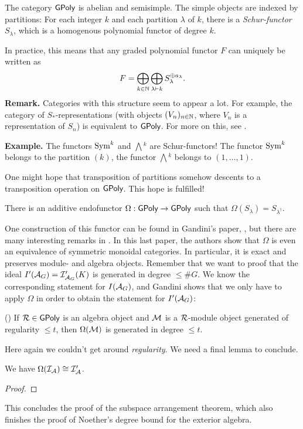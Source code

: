 \documentclass[../main.tex]{subfiles}
\begin{document}
\begin{thm}
    The category $\textnormal{$\textsf{GPoly}$}$ is abelian and semisimple. The simple objects are indexed
    by partitions: For each integer $k$ and each partition $\lambda$ of $k$, there 
    is a \emph{Schur-functor} $S_\lambda$, which is a homogenous polynomial functor
    of degree $k$.
\end{thm}
In practice, this means that any graded polynomial functor $F$ can uniquely be written as
\begin{equation*}
    F = \bigoplus_{k \in \mathbb{N}} \bigoplus_{\lambda \vdash k} S_\lambda^{\oplus a_\lambda}.
\end{equation*}
\textbf{Remark.} Categories with this structure seem to appear a lot. For
example, the category of $S_*$-representations (with objects $(V_n)_{n \in \mathbb{N}}$, where
$V_n$ is a representation of $S_n$) is equivalent to $\textnormal{$\textsf{GPoly}$}$. For more on this,
see \cite{sam2012introduction}.

\textbf{Example.} The functors $\operatorname{Sym}^k$ and $\bigwedge{}^k$ are Schur-functors! 
The functor $\operatorname{Sym}^k$ belongs to the partition $(k)$, the functor
$\bigwedge{}^k$ belongs to $(1,\dots, 1)$.

One might hope that transposition of partitions somehow descents to 
a transposition operation on $\textnormal{$\textsf{GPoly}$}$. This hope is fulfilled!
\begin{thm}[]
    There is an additive endofunctor $\Omega: \textnormal{$\textsf{GPoly}$} \to \textnormal{$\textsf{GPoly}$}$ such that 
    $\Omega(S_\lambda) = S_{\lambda^\dagger}$.
\end{thm}
One construction of this functor can be found in Gandini's paper,
\cite{Gandini2019ResOfIdeals}, but there are many interesting remarks in
\cite{sam2012introduction}. In this last paper, the authors show that $\Omega$
is even an equivalence of symmetric monoidal categories. In particular, 
it is exact and preserves module- and algebra objects. Remember that we want to
proof that the ideal $I'(\mathcal{A}_G) = \mathcal{I}'_{\mathcal{A}_G}(K)$ is generated in degree $\leq
\#G$. We know the corresponding statement for $I(\mathcal{A}_G)$, and Gandini shows
that we only have to apply $\Omega$ in order to obtain the statement for
$I'(\mathcal{A}_G)$:
\begin{prop}(\cite[Proposition 6.1]{Gandini2019ResOfIdeals})
    If $\mathcal{R} \in \textnormal{$\textsf{GPoly}$}$ is an algebra object and $\mathcal{M}$ is a $\mathcal{R}$-module object
    generated of regularity $\leq t$, then $\Omega(\mathcal{M})$ is generated in degree 
    $\leq t$. 
\end{prop}
Here again we couldn't get around \textit{regularity}. We need a final lemma to
conclude.
\begin{lem}
    We have $\Omega(\mathcal{I}_{\mathcal{A}}) \cong \mathcal{I}'_{\mathcal{A}}$.
\end{lem}
\begin{proof}
\end{proof}

This concludes the proof of the subspace arrangement theorem, which also
finishes the proof of Noether's degree bound for the exterior algebra.
\end{document}
